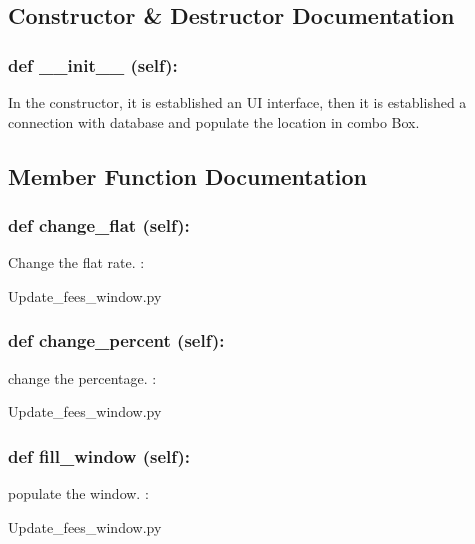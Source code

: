 \subsection{Constructor \& Destructor Documentation}
\hypertarget{class_poly_aa3def076b74bed67904976ad4f9fe9b1}{
\subsubsection[{def __init__ (self):}]{\setlength{\rightskip}{0pt plus 5cm}def {\_\_init\_\_} (self): 
}}
In the constructor, it is established an UI interface, then it is  established a connection with database and populate the location in combo Box.
 

\subsection{Member Function Documentation}
\hypertarget{class_poly_a14a7ad77ce612b0c54f531d307ee4b39}{
\subsubsection[{def change_flat (self):}]{\setlength{\rightskip}{0pt plus 5cm}def {change\_flat} (self):}}\label{class_poly_a14a7ad77ce612b0c54f531d307ee4b39}
Change the flat rate.
:\begin{DoxyCompactItemize}
\item 
Update\_fees\_window.\-py\end{DoxyCompactItemize}

\hypertarget{class_poly_a14a7ad77ce612b0c54f531d307ee4b39}{
\subsubsection[{def change_percent (self):}]{\setlength{\rightskip}{0pt plus 5cm}def {change\_percent} (self):}}\label{class_poly_a14a7ad77ce612b0c54f531d307ee4b39}
change the percentage.
:\begin{DoxyCompactItemize}
\item 
Update\_fees\_window.\-py\end{DoxyCompactItemize}

\hypertarget{class_poly_a14a7ad77ce612b0c54f531d307ee4b39}{
\subsubsection[{def fill_window (self):}]{\setlength{\rightskip}{0pt plus 5cm}def {fill\_window} (self):}}\label{class_poly_a14a7ad77ce612b0c54f531d307ee4b39}
populate the window.
:\begin{DoxyCompactItemize}
\item 
Update\_fees\_window.\-py\end{DoxyCompactItemize}

